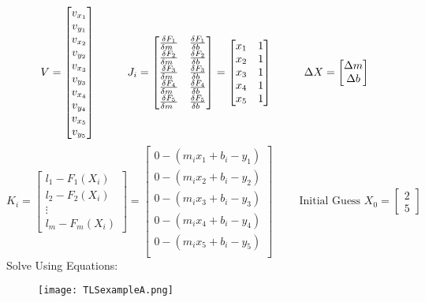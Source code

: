 \[
V = 
\begin{bmatrix}
v_{x_1} \\
v_{y_1} \\
v_{x_2} \\
v_{y_2} \\
v_{x_3} \\
v_{y_3} \\
v_{x_4} \\
v_{y_4} \\
v_{x_5} \\
v_{y_5} \\
\end{bmatrix}
\hspace{1cm}
J_i = \begin{bmatrix}
\frac{\delta F_1}{\delta m_{\phantom{0}}} & \frac{\delta F_1}{\delta b_{\phantom{0}}} \\
\frac{\delta F_2}{\delta m_{\phantom{0}}} & \frac{\delta F_2}{\delta b_{\phantom{0}}} \\
\frac{\delta F_3}{\delta m_{\phantom{0}}} & \frac{\delta F_3}{\delta b_{\phantom{0}}} \\
\frac{\delta F_4}{\delta m_{\phantom{0}}} & \frac{\delta F_4}{\delta b_{\phantom{0}}} \\
\frac{\delta F_5}{\delta m_{\phantom{0}}} & \frac{\delta F_5}{\delta b_{\phantom{0}}} \\
\end{bmatrix}
=
\begin{bmatrix}
x_1 & 1 \\
x_2 & 1 \\
x_3 & 1 \\
x_4 & 1 \\
x_5 & 1 \\
\end{bmatrix}
\hspace{1cm}
\Delta X = 
\begin{bmatrix}
\Delta m \\ \Delta b
\end{bmatrix}
\]
\[
K_i = 
\begin{bmatrix}
l_1 - F_1(X_i) \\ l_2 - F_2(X_i)\\ \vdots \\ l_m - F_m(X_i)
\end{bmatrix}
= 
\begin{bmatrix}
0 - (m_ix_1+b_i-y_1)\\ 
0 - (m_ix_2+b_i-y_2)\\
0 - (m_ix_3+b_i-y_3)\\ 
0 - (m_ix_4+b_i-y_4)\\
0 - (m_ix_5+b_i-y_5)\\
\end{bmatrix}
\hspace{1cm}
\text{Initial Guess } X_0 = 
\begin{bmatrix}
2 \\ 5
\end{bmatrix}
\]
Solve Using Equations:

\begin{figure}[H]
	\centering
	\texttt{[image: TLSexampleA.png]}
\end{figure}



